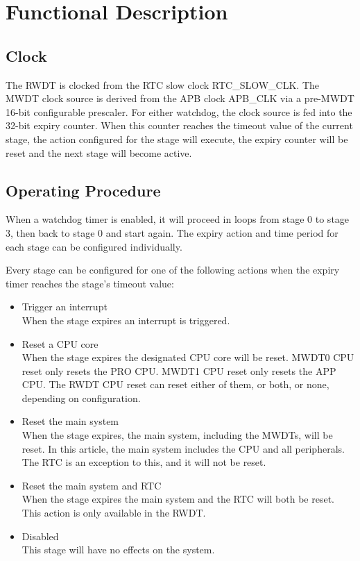 \documentclass[main\_\_EN.tex]{subfiles}
\begin{document}
\section{Functional Description}
\subsection{Clock}
The RWDT is clocked from the RTC slow clock RTC\_SLOW\_CLK. The MWDT clock source is derived from the APB clock APB\_CLK via a pre-MWDT 16-bit configurable prescaler. For either watchdog, the clock source is fed into the 32-bit expiry counter. When this counter reaches the timeout value of the current stage, the action configured for the stage will execute, the expiry counter will be reset and the next stage will become active.

\subsection{Operating Procedure}
When a watchdog timer is enabled, it will proceed in loops from stage 0 to stage 3, then back to stage 0 and start again. The expiry action and time period for each stage can be configured individually.

Every stage can be configured for one of the following actions when the expiry timer reaches the stage's timeout value:
\begin{itemize}
    \item Trigger an interrupt\\
    When the stage expires an interrupt is triggered.
    \item Reset a CPU core\\
    When the stage expires the designated CPU core will be reset. MWDT0 CPU reset only resets the PRO CPU. MWDT1 CPU reset only resets the APP CPU. The RWDT CPU reset can reset either of them, or both, or none, depending on configuration.
    \item Reset the main system\\
    When the stage expires, the main system, including the MWDTs, will be reset. In this article, the main system includes the CPU and all peripherals. The RTC is an exception to this, and it will not be reset.
    \item Reset the main system and RTC\\
    When the stage expires the main system and the RTC will both be reset. This action is only available in the RWDT.
    \item Disabled\\
    This stage will have no effects on the system.
\end{itemize}
\end{document}
